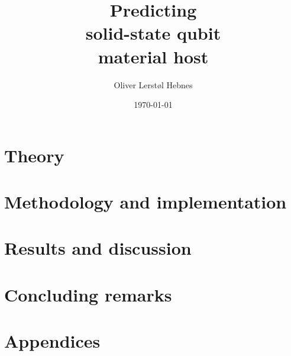 \documentclass[twoside, english, notitlepage, 12pt]{uiofysmaster}
\author{Oliver Lerstøl Hebnes}
\title{Predicting\\
solid-state qubit\\
material host
}
\date{\today}
\begin{document}
\hypersetup{pageanchor=false}
\frontmatter

    \maketitle

    \begin{abstract}
      
    \end{abstract}

    \begin{dedication}
      
    \end{dedication}

    \begin{acknowledgements}
      
    \end{acknowledgements}

    \setcounter{tocdepth}{2}
    \tableofcontents

\mainmatter

      

    \part{Theory}
        
        
        

    \part{Methodology and implementation}

        

    \part{Results and discussion}

      
      
      

    \part{Concluding remarks}
      

    \printbibliography%

    \part{Appendices}
    \appendix
        
\end{document}
